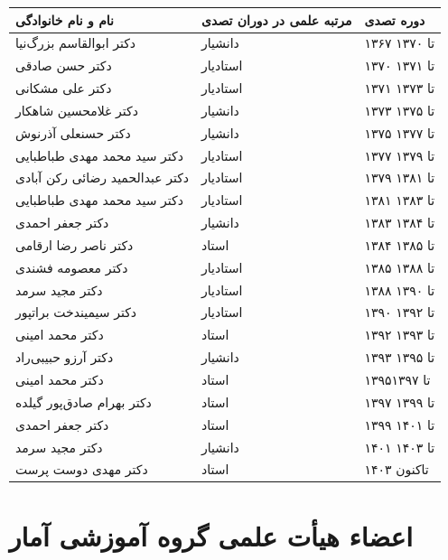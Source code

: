 \documentclass[
  letterpaper,
  DIV=11,
  numbers=noendperiod]{scrreprt}
\newcounter{none} %
\begin{document}
{\def\LTcaptype{none} %
\begin{longtable}[]{@{}lll@{}}
\toprule\noalign{}
نام و نام خانوادگی & مرتبه علمی در دوران تصدی & دوره تصدی \\
\midrule\noalign{}
\endhead
\bottomrule\noalign{}
\endlastfoot
دکتر ابوالقاسم بزرگ‌نیا & دانشیار & ۱۳۶۷ تا ۱۳۷۰ \\
دکتر حسن صادقی & استادیار & ۱۳۷۰ تا ۱۳۷۱ \\
دکتر علی مشکانی & استادیار & ۱۳۷۱ تا ۱۳۷۳ \\
دکتر غلامحسین شاهکار & دانشیار & ۱۳۷۳ تا ۱۳۷۵ \\
دکتر حسنعلی آذرنوش & دانشیار & ۱۳۷۵ تا ۱۳۷۷ \\
دکتر سید محمد مهدی طباطبایی & استادیار & ۱۳۷۷ تا ۱۳۷۹ \\
دکتر عبدالحمید رضائی رکن آبادی & استادیار & ۱۳۷۹ تا ۱۳۸۱ \\
دکتر سید محمد مهدی طباطبایی & استادیار & ۱۳۸۱ تا ۱۳۸۳ \\
دکتر جعفر احمدی & دانشیار & ۱۳۸۳ تا ۱۳۸۴ \\
دکتر ناصر رضا ارقامی & استاد & ۱۳۸۴ تا ۱۳۸۵ \\
دکتر معصومه فشندی & استادیار & ۱۳۸۵ تا ۱۳۸۸ \\
دکتر مجید سرمد & استادیار & ۱۳۸۸ تا ۱۳۹۰ \\
دکتر سیمیندخت براتپور & استادیار & ۱۳۹۰ تا ۱۳۹۲ \\
دکتر محمد امینی & استاد & ۱۳۹۲ تا ۱۳۹۳ \\
دکتر آرزو حبیبی‌راد & دانشیار & ۱۳۹۳ تا ۱۳۹۵ \\
دکتر محمد امینی & استاد & ۱۳۹۵تا ۱۳۹۷ \\
دکتر بهرام صادق‌پور گیلده & استاد & ۱۳۹۷ تا ۱۳۹۹ \\
دکتر جعفر احمدی & استاد & ۱۳۹۹ تا ۱۴۰۱ \\
دکتر مجید سرمد & دانشیار & ۱۴۰۱ تا ۱۴۰۳ \\
دکتر مهدی دوست پرست & استاد & ۱۴۰۳ تاکنون \\
\end{longtable}
}

\section{اعضاء هیأت علمی گروه آموزشی
آمار}\label{ux627ux639ux636ux627ux621-ux647ux6ccux623ux62a-ux639ux644ux645ux6cc-ux6afux631ux648ux647-ux622ux645ux648ux632ux634ux6cc-ux622ux645ux627ux631}
\end{document}
